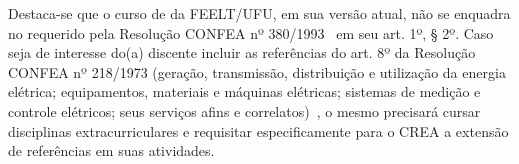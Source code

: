 Destaca-se que o curso de \ppccurso da FEELT/UFU, em sua versão atual, não se enquadra no requerido pela Resolução CONFEA nº 380/1993~\cite{CONFEA:380:1993} em seu art. 1º, § 2º. Caso seja de interesse do(a) discente incluir as referências do art. 8º da Resolução CONFEA nº 218/1973 (geração, transmissão, distribuição e utilização da energia elétrica; equipamentos, materiais e máquinas elétricas; sistemas de medição e controle elétricos; seus serviços afins e correlatos)~\cite{CONFEA:218:1973}, o mesmo precisará cursar disciplinas extracurriculares e requisitar especificamente para o CREA a extensão de referências em suas atividades.
